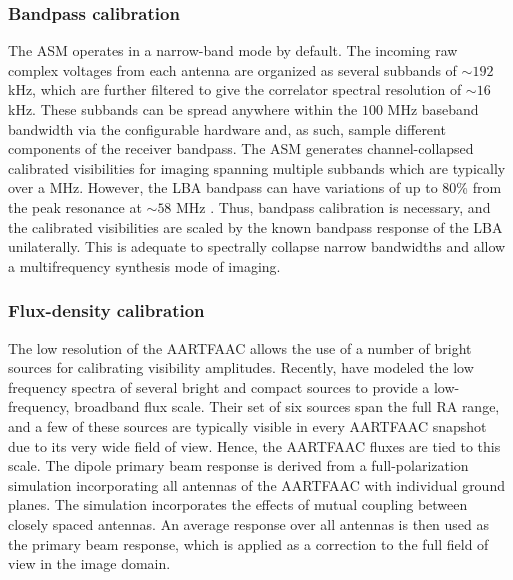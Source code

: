 \documentclass[referee]{aa}
\begin{document}

\subsubsection{Bandpass calibration}

The ASM  operates in a  narrow-band mode by  default.  The incoming  raw complex
voltages from each antenna are organized as several subbands of $\sim$$192$ kHz,
which  are  further filtered  to  give  the  correlator spectral  resolution  of
$\sim$$16$  kHz. These  subbands can  be spread  anywhere within  the  $100$ MHz
baseband bandwidth via the configurable  hardware and, as such, sample different
components  of  the  receiver  bandpass.  The  ASM  generates  channel-collapsed
calibrated  visibilities  for  imaging  spanning  multiple  subbands  which  are
typically over  a MHz. However,  the LBA bandpass  can have variations of  up to
80\%  from the  peak  resonance at  $\sim$$58$ MHz  \citep{vanhaarlem2013lofar}.
Thus,  bandpass calibration is  necessary, and  the calibrated  visibilities are
scaled by the known bandpass response  of the LBA unilaterally. This is adequate
to spectrally collapse narrow  bandwidths and allow a multifrequency synthesis
mode of imaging.


\subsubsection{Flux-density calibration}

The low resolution of the AARTFAAC allows  the use of a number of bright sources
for calibrating  visibility amplitudes.  Recently,  \citet{scaife2012broad} have
modeled  the low  frequency spectra  of several  bright and  compact  sources to
provide a low-frequency, broadband flux scale. Their set of six sources span the
full  RA range,  and  a few  of these  sources  are typically  visible in  every
AARTFAAC  snapshot due  to its  very wide  field of  view.  Hence,  the AARTFAAC
fluxes are tied to this scale.  The dipole primary beam response is derived from
a full-polarization  simulation incorporating all antennas of  the AARTFAAC with
individual  ground planes.  The  simulation incorporates  the effects  of mutual
coupling between closely spaced antennas.  An average response over all antennas
is then used as  the primary beam response, which is applied  as a correction to
the full field of view in the image domain.
\end{document}
